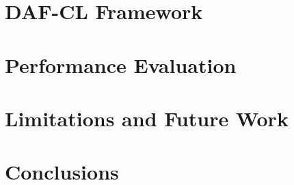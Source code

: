 \documentclass{ieeeaccess}
\def\textsc#1{\textnormal{{\sc #1}}}%
\begin{document}

% 



\section{\textsc{DAF-CL} Framework}\label{sec:Model 1}





\section{Performance Evaluation}\label{sec:performance evaluation}



\section{Limitations and Future Work}\label{sec: limitations}



\section{Conclusions}\label{sec:Conclusion}












\end{document}
